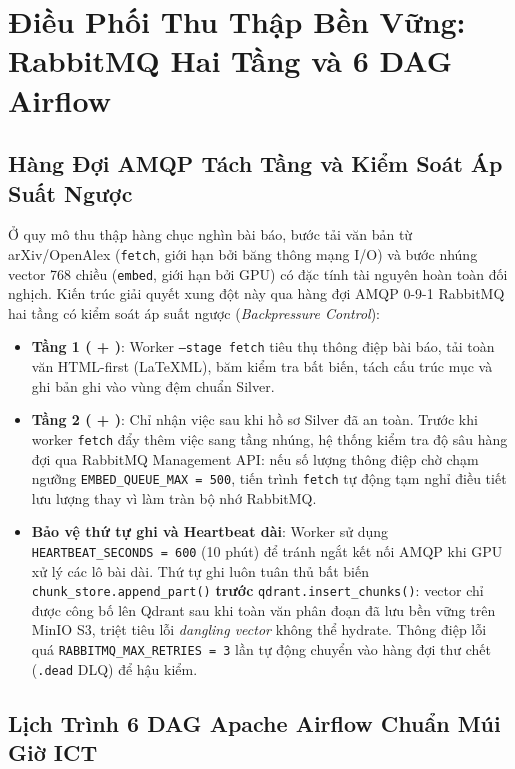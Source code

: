 \section{Điều Phối Thu Thập Bền Vững: RabbitMQ Hai Tầng và 6 DAG Airflow}
\label{sec:ch6_orchestration}

\subsection{Hàng Đợi AMQP Tách Tầng và Kiểm Soát Áp Suất Ngược}
\label{sec:ch6_rabbitmq}

Ở quy mô thu thập hàng chục nghìn bài báo, bước tải văn bản từ arXiv/OpenAlex (\texttt{fetch}, giới hạn bởi băng thông mạng I/O) và bước nhúng vector 768 chiều (\texttt{embed}, giới hạn bởi GPU) có đặc tính tài nguyên hoàn toàn đối nghịch. Kiến trúc  giải quyết xung đột này qua hàng đợi AMQP 0-9-1 RabbitMQ hai tầng có kiểm soát áp suất ngược (\textit{Backpressure Control}):
\begin{itemize}
  \item \textbf{Tầng 1 ( + )}: Worker \texttt{--stage fetch} tiêu thụ thông điệp bài báo, tải toàn văn HTML-first (LaTeXML), băm kiểm tra bất biến, tách cấu trúc mục và ghi bản ghi vào vùng đệm chuẩn Silver.
  \item \textbf{Tầng 2 ( + )}: Chỉ nhận việc sau khi hồ sơ Silver đã an toàn. Trước khi worker \texttt{fetch} đẩy thêm việc sang tầng nhúng, hệ thống kiểm tra độ sâu hàng đợi qua RabbitMQ Management API: nếu số lượng thông điệp chờ chạm ngưỡng \texttt{EMBED\_QUEUE\_MAX = 500}, tiến trình \texttt{fetch} tự động tạm nghỉ điều tiết lưu lượng thay vì làm tràn bộ nhớ RabbitMQ.
  \item \textbf{Bảo vệ thứ tự ghi và Heartbeat dài}: Worker sử dụng \texttt{HEARTBEAT\_SECONDS = 600} (10 phút) để tránh ngắt kết nối AMQP khi GPU xử lý các lô bài dài. Thứ tự ghi luôn tuân thủ bất biến \texttt{chunk\_store.append\_part()} \textbf{trước} \texttt{qdrant.insert\_chunks()}: vector chỉ được công bố lên Qdrant sau khi toàn văn phân đoạn đã lưu bền vững trên MinIO S3, triệt tiêu lỗi \textit{dangling vector} không thể hydrate. Thông điệp lỗi quá \texttt{RABBITMQ\_MAX\_RETRIES = 3} lần tự động chuyển vào hàng đợi thư chết (\texttt{.dead} DLQ) để hậu kiểm.
\end{itemize}

\subsection{Lịch Trình 6 DAG Apache Airflow Chuẩn Múi Giờ ICT}
\label{sec:ch6_airflow}


